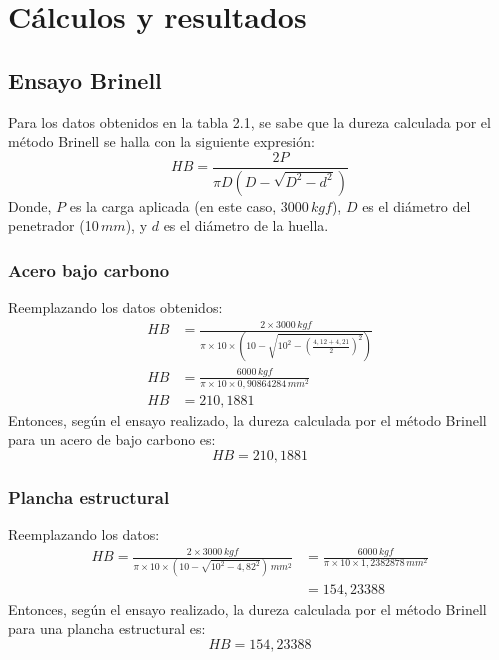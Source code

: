 \documentclass[a4paper,12pt]{report}
\begin{document}
\chapter{Cálculos y resultados}
\section{Ensayo Brinell}
Para los datos obtenidos en la tabla 2.1, se sabe que la dureza calculada por el método Brinell se halla con la siguiente expresión:
\begin{equation}
HB = \frac{2P}{\pi D\left(D-\sqrt{D^{2}-d^{2}}\right)}
\end{equation}
Donde, $P$ es la carga aplicada (en este caso, 3000$\,kgf$), $D$ es el diámetro del penetrador (10$\,mm$), y $d$ es el diámetro de la huella.
\subsection{Acero bajo carbono}
Reemplazando los datos obtenidos:
\begin{equation}
\begin{aligned}
HB &= \frac{2\times 3000\,kgf}{\pi \times 10 \times \left( 10 - \sqrt{{10}^{2}-\left(\frac{4,12+4,21}{2}\right)^{2}}\right)}\\[3.14pt]
HB &= \frac{6000\,kgf}{\pi \times 10 \times 0,90864284\,mm^{2}} \\[3.14pt]
HB &= 210,1881
\end{aligned}
\end{equation}
Entonces, según el ensayo realizado, la dureza calculada por el método Brinell para un acero de bajo carbono es:
$$
HB = 210,1881
$$
\subsection{Plancha estructural}
Reemplazando los datos:
\begin{equation}
\begin{aligned}
HB = \frac{2\times 3000\,kgf}{\pi \times 10 \times \left( 10 - \sqrt{10^{2}-4,82^{2}}\right)\,mm^{2}} &= \frac{6000\,kgf}{\pi \times 10 \times 1,2382878\,mm^{2}} \\[3.14pt]
&= 154,23388
\end{aligned}
\end{equation}
Entonces, según el ensayo realizado, la dureza calculada por el método Brinell para una plancha estructural es:
$$
HB = 154,23388
$$
\end{document}

